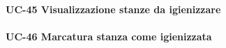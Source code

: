 \paragraph{UC-45 Visualizzazione stanze da igienizzare}

\paragraph{UC-46 Marcatura stanza come igienizzata}